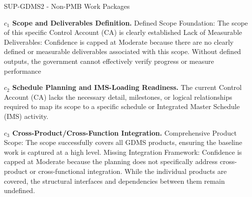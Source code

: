 \begin{frame}{SUP-GDMS2 - Non-PMB Work Packages}
\begin{minipage}{0.90\textwidth}
\raggedright
\fontsize{8}{9.5}\selectfont
\textbf{\(c_1\) Scope and Deliverables Definition.}
Defined Scope Foundation: The scope of this specific Control Account (CA) is clearly established Lack of Measurable Deliverables: Confidence is capped at Moderate because there are no clearly defined or measurable deliverables associated with this scope. Without defined outputs, the government cannot effectively verify progress or measure performance\par\vspace{0.6em}
\textbf{\(c_2\) Schedule Planning and IMS-Loading Readiness.}
The current Control Account (CA) lacks the necessary detail, milestones, or logical relationships required to map its scope to a specific schedule or Integrated Master Schedule (IMS) activity.\par\vspace{0.6em}
\textbf{\(c_3\) Cross-Product/Cross-Function Integration.}
Comprehensive Product Scope: The scope successfully covers all GDMS products, ensuring the baseline work is captured at a high level. Missing Integration Framework: Confidence is capped at Moderate because the planning does not specifically address cross-product or cross-functional integration. While the individual products are covered, the structural interfaces and dependencies between them remain undefined.\par\vspace{0.6em}
\end{minipage}
\end{frame}

\endinput
